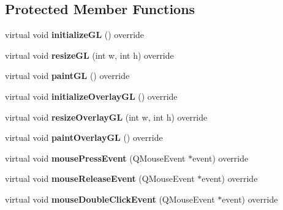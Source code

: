 \subsection*{Protected Member Functions}
\begin{DoxyCompactItemize}
\item 
\mbox{\label{class_q_qt_open_g_l_widget_a506d451fd93c86357dd592bf17a33847}} 
virtual void {\bfseries initialize\+GL} () override
\item 
\mbox{\label{class_q_qt_open_g_l_widget_acf0d60b4a6e63b509bb0b107241ca119}} 
virtual void {\bfseries resize\+GL} (int w, int h) override
\item 
\mbox{\label{class_q_qt_open_g_l_widget_a4fda7dab434c8db8f91a4130696a2f8e}} 
virtual void {\bfseries paint\+GL} () override
\item 
\mbox{\label{class_q_qt_open_g_l_widget_afd8be7063a3a421c476195105dae0edd}} 
virtual void {\bfseries initialize\+Overlay\+GL} () override
\item 
\mbox{\label{class_q_qt_open_g_l_widget_a0a258c0ef83db7ac75b2548f14339580}} 
virtual void {\bfseries resize\+Overlay\+GL} (int w, int h) override
\item 
\mbox{\label{class_q_qt_open_g_l_widget_ab7e9a60837e16af7c4c4bbcd3ccfb411}} 
virtual void {\bfseries paint\+Overlay\+GL} () override
\item 
\mbox{\label{class_q_qt_open_g_l_widget_a9b8ada1eabd86bda334d7e37ffae3a9d}} 
virtual void {\bfseries mouse\+Press\+Event} (Q\+Mouse\+Event $\ast$event) override
\item 
\mbox{\label{class_q_qt_open_g_l_widget_a9fa1422ef2c17db60619ce1dc86d746b}} 
virtual void {\bfseries mouse\+Release\+Event} (Q\+Mouse\+Event $\ast$event) override
\item 
\mbox{\label{class_q_qt_open_g_l_widget_a644890826eb85cdf28926d5c9c6d3fa5}} 
virtual void {\bfseries mouse\+Double\+Click\+Event} (Q\+Mouse\+Event $\ast$event) override
\end{DoxyCompactItemize}


